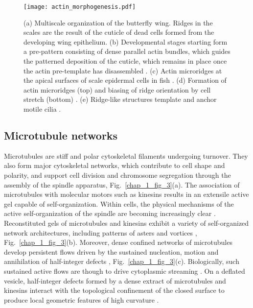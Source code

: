 \begin{figure}
	\centering
	\texttt{[image: actin\_morphogenesis.pdf]}
	\caption{\label{chap_1_fig_777} (a) Multiscale organization of the butterfly wing. Ridges in the scales are the result of the cuticle of dead cells formed from the developing wing epithelium. (b) Developmental stages starting form a pre-pattern consisting of dense parallel actin bundles, which guides the patterned deposition of the cuticle, which remains in place once the actin pre-template has disassembled \cite{DINWIDDIE2014404}.  (c) Actin microridges at the apical surfaces of scale epidermal cells in fish \cite{https://doi.org/10.1002/ar.23965} . (d) Formation of actin microridges (top) and biasing of ridge orientation by cell stretch (bottom) \cite{10.1083/jcb.201904144}. (e) Ridge-like structures template and anchor motile cilia \cite{Yasunaga:2022uh}.}
\end{figure}

\clearpage

\subsection{Microtubule networks}

Microtubules are stiff and polar cytoskeletal filaments undergoing turnover. They also form major cytoskeletal networks, which  contribute to cell shape and polarity, and support cell division and chromosome segregation through the assembly of the  spindle apparatus, Fig.~\ref{chap_1_fig_3}(a). The association of microtubules with molecular motors such as kinesins results in an extensile active gel capable of self-organization. Within cells, the physical mechanisms of the active self-organization of the spindle are becoming increasingly clear \cite{Dalton:2022wg}. Reconstituted gels of microtubules and kinesins exhibit a variety of self-organized network architectures, including patterns of asters and vortices \cite{ndlec1997, surrey2001}, Fig.~\ref{chap_1_fig_3}(b). Moreover, dense confined networks of microtubules develop persistent flows driven by the sustained nucleation, motion and annihilation of half-integer defects \cite{sanchez2012}, Fig.~\ref{chap_1_fig_3}(c). Biologically, such sustained active flows are though to drive cytoplasmic streaming \cite{serbus2005}. On a deflated vesicle, half-integer defects formed by a dense extract of microtubules and kinesins interact with the topological confinement of the closed surface to produce local geometric features of high curvature \cite{keber2014}.

